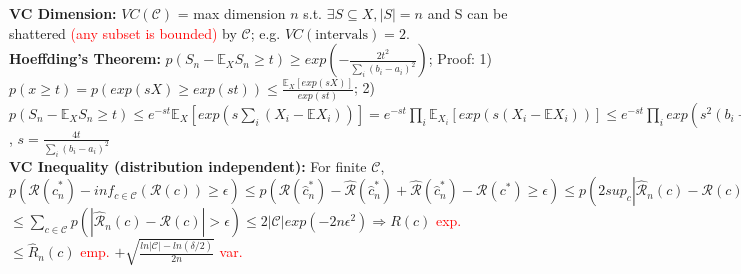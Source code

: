\textbf{VC Dimension: } $VC(\mathcal{C})$ = max dimension $n$ s.t. $\exists S \subseteq X, |S| = n$ and S can be shattered \textcolor{red}{(any subset is bounded)} by $\mathcal{C}$; e.g. $VC(\text{intervals}) = 2$. \\
\textbf{Hoeffding's Theorem: } 
$p(S_n - \mathbb{E}_XS_n \geq t) \geq exp(-\frac{2t^2}{\sum_i (b_i - a_i)^2})$; Proof: 1) $p(x \geq t) = p(exp(sX) \geq exp(st)) \leq \frac{\mathbb{E}_X [exp(sX)]}{exp(st)}$; 2) $p(S_n - \mathbb{E}_XS_n \geq t) \leq e^{-st}\mathbb{E}_X[exp(s\sum_i (X_i - \mathbb{E}X_i))] = e^{-st}\prod_i\mathbb{E}_{X_i}[exp(s(X_i-\mathbb{E}X_i))] \leq e^{-st}\prod_iexp(s^2(b_i-a_i)^2/8)$, $s = \frac{4t}{\sum_i(b_i-a_i)^2}$
\\
\textbf{VC Inequality (distribution independent): } For finite $\mathcal{C}$, $p(\mathcal{R}(\hat{c}_n^*) - inf_{c \in \mathcal{C}}(\mathcal{R}(c)) \geq \epsilon) \leq p(\mathcal{R}(\hat{c}_n^*) - \hat{\mathcal{R}}(\hat{c}_n^*) + \hat{\mathcal{R}}(\hat{c}_n^*) - \mathcal{R}(c^*) \geq \epsilon) \leq p(2sup_{c}|\hat{\mathcal{R}}_n(c) - \mathcal{R}(c)| > \epsilon)$
$\leq \sum_{c \in \mathcal{C}}p(|\hat{\mathcal{R}}_n(c) - \mathcal{R}(c)| > \epsilon) \leq 2|\mathcal{C}|exp(-2n\epsilon^2) \Rightarrow R(c)$ \textcolor{red}{exp.} $ \leq \hat{R}_n(c) $ \textcolor{red}{emp.} $ + \sqrt{\frac{ln |\mathcal{C}| - ln(\delta / 2)}{2n}}$ \textcolor{red}{var.}
